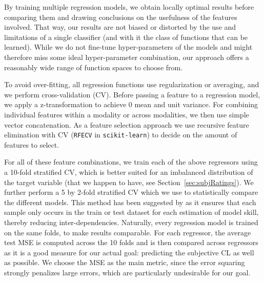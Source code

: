 \documentclass[output=paper]{langsci/langscibook}
\begin{document}
By training multiple regression models, we obtain locally optimal results before comparing them and drawing conclusions on the usefulness of the features involved. That way, our results are not biased or distorted by the use and limitations of a single classifier (and with it the class of functions that can be learned). While we do not fine-tune hyper-parameters of the models and might therefore miss some ideal hyper-parameter combination, our approach offers a reasonably wide range of function spaces to choose from.

To avoid over-fitting, all regression functions use regularization or averaging, and we perform cross-validation (CV).
Before passing a feature to a regression model, we apply a z-transformation to achieve 0 mean and unit variance.
For combining individual features within a modality or across modalities, we then use simple vector concatenation.
As a feature selection approach we use recursive feature elimination with CV (\texttt{RFECV} in \texttt{scikit-learn}) to decide on the amount of features to select.

For all of these feature combinations, we train each of the above regressors using a 10-fold stratified CV, which is better suited for an imbalanced distribution of the target variable (that we happen to have, see Section~\ref{sec:subjRatings}).
We further perform a 5 by 2-fold stratified CV which we use to statistically compare the different models. This method has been suggested by \citet{dietterich1998approximate} as it ensures that each sample only occurs in the train or test dataset for each estimation of model skill, thereby reducing inter-dependencies. Naturally, every regression model is trained on the same folds, to make results comparable.
For each regressor, the average test MSE is computed across the 10 folds and is then compared across regressors as it is a good measure for our actual goal: predicting the subjective CL as well as possible. We choose the MSE as the main metric, since the error squaring strongly penalizes large errors, which are particularly undesirable for our goal.

\end{document}
